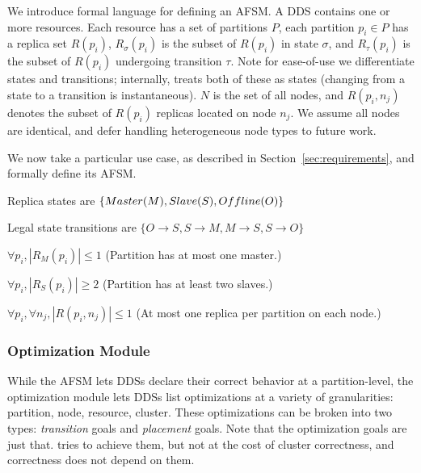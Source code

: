 We introduce formal language for defining an AFSM.
A DDS contains one or more resources. Each resource has a set of partitions $P$,
each partition $p_i \in P$ has a replica set $R(p_i)$, $R_\sigma(p_i)$ is the subset of $R(p_i)$ in state $\sigma$, and 
$R_\tau(p_i)$ is the subset of $R(p_i)$ undergoing transition $\tau$.  Note for
ease-of-use we differentiate states and transitions; internally, \helix treats both
of these as states (changing from a state to a transition is instantaneous).
$N$ is the set of all nodes, and $R(p_i, n_j)$ denotes the subset of $R(p_i)$
replicas located on
node $n_j$.  We assume all nodes are identical, and defer handling heterogeneous
node types to future work.

We now take a particular use case, \ES as described in
Section~\ref{sec:requirements}, and formally define its AFSM.
\be
\item Replica states are $\{Master (M), Slave (S), \\ Offline(O)\}$
\item Legal state transitions are $\{O \rightarrow S, S \rightarrow M,
M \rightarrow S, S \rightarrow O\}$  
\item $\forall p_i, |R_M(p_i)| \le 1$  (Partition has at most one master.)
\item $\forall p_i, |R_S(p_i)| \ge 2$  (Partition has at least two slaves.)   
\item $\forall p_i, \forall n_j, |R(p_i, n_j)| \le 1$ (At most one replica per partition
on each node.)
\ee
{}%

\subsubsection{Optimization Module}
%
While the AFSM lets DDSs declare their correct behavior at a partition-level, the optimization module
lets DDSs list optimizations at a variety of granularities: partition, node,
resource, cluster.  These optimizations can be broken into two types:
\emph{transition} goals and \emph{placement} goals.
Note that the optimization goals are just that.  \helix tries to achieve them,
but not at the cost of cluster correctness, and correctness does not depend on
them. 

